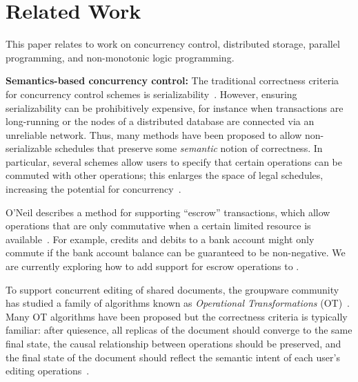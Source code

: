 \section{Related Work}
\label{sec:relwork}

This paper relates to work on concurrency control, distributed storage, parallel
programming, and non-monotonic logic programming.

\vspace{0.5em}\noindent
\textbf{Semantics-based concurrency control:} The traditional correctness
criteria for concurrency control schemes is
serializability~\cite{Papadimitriou1979}. However, ensuring serializability can
be prohibitively expensive, for instance when transactions are long-running or
the nodes of a distributed database are connected via an unreliable
network. Thus, many methods have been proposed to allow non-serializable
schedules that preserve some \emph{semantic} notion of correctness. In
particular, several schemes allow users to specify that certain operations can
be commuted with other operations; this enlarges the space of legal schedules,
increasing the potential for concurrency~\cite{Farrag1989,Garcia-Molina1983,Weihl1988}.


O'Neil describes a method for supporting ``escrow'' transactions, which allow
operations that are only commutative when a certain limited resource is
available~\cite{O'Neil1986}. For example, credits and debits to a bank account
might only commute if the bank account balance can be guaranteed to be
non-negative. We are currently exploring how to add support for escrow
operations to \lang.


To support concurrent editing of shared documents, the groupware community has
studied a family of algorithms known as \emph{Operational Transformations}
(OT)~\cite{Ellis1989,Sun1998}. Many OT algorithms have been proposed but the
correctness criteria is typically familiar: after quiesence, all replicas of the
document should converge to the same final state, the causal relationship
between operations should be preserved, and the final state of the document
should reflect the semantic intent of each user's editing
operations~\cite{Sun1998a}.

